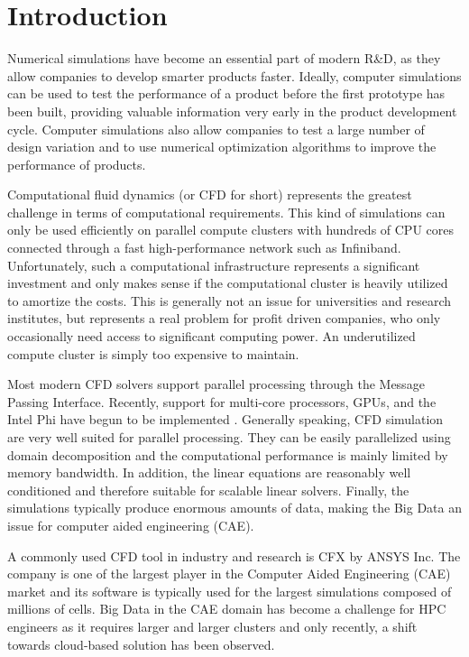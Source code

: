\documentclass[3p,times]{elsarticle}
\begin{document}

\section{Introduction} 
\label{sec:introduction}

Numerical simulations have become an essential part of modern R\&D, as they allow companies to develop smarter products faster. Ideally, computer simulations can be used to test the performance of a product before the first prototype has been built, providing valuable information very early in the product development cycle. Computer simulations also allow companies to test a large number of design variation and to use numerical optimization algorithms to improve the performance of products.
 
Computational fluid dynamics (or CFD for short) represents the greatest challenge in terms of computational requirements. This kind of simulations can only be used efficiently on parallel compute clusters with hundreds of CPU cores connected through a fast high-performance network such as Infiniband. Unfortunately, such a computational infrastructure represents a significant investment and only makes sense if the computational cluster is heavily utilized to amortize the costs. This is generally not an issue for universities and research institutes, but represents a real problem for profit driven companies, who only occasionally need access to significant computing power. An underutilized compute cluster is simply too expensive to maintain.
 
Most modern CFD solvers support parallel processing through the Message Passing Interface\cite{MPI}. Recently, support for multi-core processors, GPUs, and the Intel Phi have begun to be implemented \cite{tomczak2013} \cite{Che09042015}. Generally speaking, CFD simulation are very well suited for parallel processing. They can be easily parallelized using domain decomposition and the computational performance is mainly limited by memory bandwidth. In addition, the linear equations are reasonably well conditioned and therefore suitable for scalable linear solvers. Finally, the simulations typically produce enormous amounts of data, making the Big Data an issue for computer aided engineering (CAE).

A commonly used CFD tool in industry and research is CFX by ANSYS Inc. The company is one of the largest player in the Computer Aided Engineering (CAE) market \cite{mcae2012} and its software is typically used for the largest simulations composed of millions of cells. Big Data in the CAE domain has become a challenge for HPC engineers as it requires larger and larger clusters and only recently, a shift towards cloud-based solution has been observed.
\end{document}
